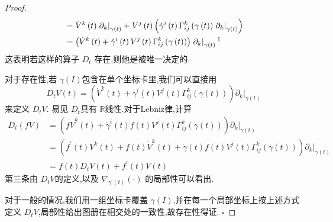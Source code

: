 \documentclass[../../几何与拓扑.tex]{subfiles}
\begin{document}
\begin{proof}
\[\begin{aligned}
        & =  \dot{V}^{k}\left( t \right) \left. \partial _{k} \right|_{ \gamma \left( t \right) } +   V^{j}\left( t \right) \left(  \dot{\gamma}^{i}\left( t \right)  \Gamma _{ij}^{k} \left(  \gamma \left( t \right)  \right)\left. \partial _{k} \right|_{ \gamma \left( t \right) }   \right)  \\ 
         & =  \left( \dot{V}^{k}\left( t \right) +  \dot{\gamma}^{i}\left( t \right)V^{j}\left( t \right)  \Gamma _{ij}^{k} \left(  \gamma \left( t \right)  \right)     \right) \left. \partial _{k} \right|_{ \gamma \left( t \right) } 
        \footnotemark 
    \end{aligned}
    \]     这表明若这样的算子 \(  D_{t}  \)   存在,则他是被唯一决定的.

    对于存在性,若 \(   \gamma \left( I \right)   \)包含在单个坐标卡里,我们可以直接用 \begin{equation}
        D_{t}V\left( t \right) =  \left( \dot{V}^{k}\left( t \right)+  \dot{\gamma}^{i}\left( t \right)V^{j}\left( t \right) \Gamma _{ij}^{k}\left(  \gamma \left( t \right)  \right)     \right)\left. \partial _{k} \right|_{ \gamma \left( t \right) }  
    \end{equation} \label{沿曲线的向量场坐标}来定义 \(  D_{t}V  \).  
    易见 \(  D_{t}  \)具有 \(  \mathbb{R}   \)线性.对于Lebniz律,计算 \[
    \begin{aligned}
        D_{t} \left( fV \right) & =   \left( \dot{fV}^{k}\left( t \right)+   \dot{\gamma}^{i}\left( t \right)f\left( t \right)V^{j}\left( t \right) \Gamma _{ij}^{k}\left(  \gamma \left( t \right)  \right)       \right)\left. \partial _{k} \right|_{ \gamma \left( t \right) }\\ 
         & =   \left( f^{\prime} \left( t \right)V^{k}\left( t \right)+  f\left( t \right)\dot{V}^{k}\left( t \right) +  \dot{\gamma}\left( t \right)f\left( t \right)V^{j}\left( t \right) \Gamma _{ij}^{k} \left(  \gamma \left( t \right)  \right)         \right)\left. \partial _{k} \right|_{  \gamma \left( t \right) } \\ 
          & =  f\left( t \right) D_{t}V\left( t \right)  + f^{\prime} \left( t \right) V\left( t \right)  
    \end{aligned}  
    \]  第三条由 \(  D_{t}V  \)的定义,以及 \(   \nabla _{ \gamma ^{\prime} \left( t \right) }\left( \cdot  \right)   \)  的局部性可以看出.

    对于一般的情况,我们用一组坐标卡覆盖 \(   \gamma \left( I \right)   \),并在每一个局部坐标上按上述方式定义 \(  D_{t}V  \),局部性给出图册在相交处的一致性,故存在性得证. 
    \hfill $\square$
\end{proof}
\end{document}
